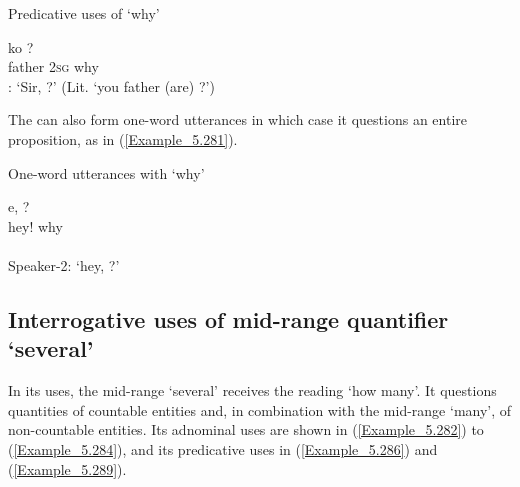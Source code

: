 \begin{styleExampleTitle}
Predicative uses of  ‘why’
\end{styleExampleTitle}

\ea
\label{Example_5.280}
 {ko} {?}\\ %
 father  \textsc{2sg}  why\\
: ‘Sir, ?’ (Lit. ‘you father (are) ?’) \textstyleExampleSource{[081108-001-JR.0005]}
\z


The  can also form one-word utterances in which case it questions an entire proposition, as in (\ref{Example_5.281}).


\begin{styleExampleTitle}
One-word utterances with  ‘why’
\end{styleExampleTitle}

\ea
\label{Example_5.281}
 {} {e,} {?}\\ %
  {} {}  hey!  why\\
\\
Speaker-2: ‘hey, ?’ \textstyleExampleSource{[081011-022-Cv.0147-0151]}
\z


\subsection{Interrogative uses of mid-range {quantifier}  ‘several’}
\label{Para_5.8.7}
In its  uses, the mid-range   ‘several’ receives the reading ‘how many’. It questions quantities of countable entities and, in combination with the mid-range   ‘many’, of non-countable entities. Its adnominal uses are shown in (\ref{Example_5.282}) to (\ref{Example_5.284}), and its predicative uses in (\ref{Example_5.286}) and (\ref{Example_5.289}).

